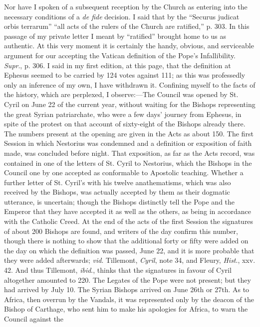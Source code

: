 Nor have I spoken of a subsequent reception by the Church as entering
into the necessary conditions of a \emph{de fide} decision. I said that
by the ``Securus judicat orbis terrarum'' ``all acts of the rulers
of the Church are ratified,'' p. 303. In this passage of my private
letter I meant by ``ratified'' brought home to us as authentic.
At this very moment it is certainly the handy, obvious, and serviceable
argument for our accepting the Vatican definition of the Pope's
Infallibility.
\emph{Supr}., p. 306. I said in my first edition, at this page, that the
definition at Ephesus seemed to be carried by 124 votes against 111; as
this was professedly only an inference of my own, I have withdrawn it.
Confining myself to the facts of the history, which are perplexed, I
observe:—The Council was opened by St. Cyril on June 22 of the current
year, without waiting for the Bishops representing the great Syrian
patriarchate, who were a few days' journey from Ephesus, in spite of the
protest on that account of sixty-eight of the Bishops already there. The
numbers present at the opening are given in the Acts as about 150. The
first Session in which Nestorius was condemned and a definition or
exposition of faith made, was concluded before night. That exposition,
as far as the Acts record, was contained in one of the letters of St.
Cyril to Nestorius, which the Bishops in the Council one by one accepted
as conformable to Apostolic teaching. Whether a further letter of
St. Cyril's with his twelve anathematisms, which was also received by
the Bishops, was actually accepted by them as their dogmatic utterance,
is uncertain; though the Bishops distinctly tell the Pope and the
Emperor that they have accepted it as well as the others, as being in
accordance with the Catholic Creed. At the end of the acts of the first
Session the signatures of about 200 Bishops are found, and writers of
the day confirm this number, though there is nothing to show that the
additional forty or fifty were added on the day on which the definition
was passed, June 22, and it is more probable that they were added
afterwards; \emph{vid}. Tillemont, \emph{Cyril}, note 34, and Fleury, \emph{Hist}.,
xxv. 42. And thus Tillemont, \emph{ibid}., thinks that the signatures in
favour of Cyril altogether amounted to 220. The Legates of the Pope were
not present; but they had arrived by July 10. The Syrian Bishops arrived
on June 26th or 27th. As to Africa, then overrun by the Vandals, it was
represented only by the deacon of the Bishop of Carthage, who sent him
to make his apologies for Africa, to warn the Council against the
